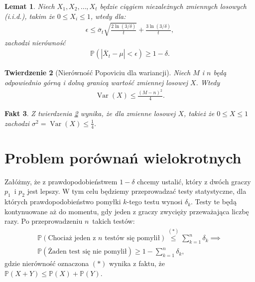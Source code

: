 \documentclass[inzynierska]{pwr_wmat_praca_dyplomowa}
\theoremstyle{plain}
\newtheorem{theorem}{Twierdzenie}
\numberwithin{theorem}{chapter}
\newtheorem{lemma}[theorem]{Lemat}
\newtheorem{fact}[theorem]{Fakt}
\theoremstyle{definition}
\numberwithin{theorem}{chapter}
\DeclareMathOperator{\Var}{\mathrm{Var}}%
\newcommand{\probP}{\mathbb{P}}
\newcommand{\newbrackets}[1]{\emph{(}{#1}\emph{)}}
\begin{document}
	\begin{lemma}\label{Bernsteina emp ineq lemma}
		Niech $X_1, X_2, \dots, X_t$ będzie ciągiem niezależnych zmiennych losowych \newbrackets{i.i.d.}, takim że $0 \le X_i \le 1$, wtedy dla:
		\begin{gather*}
			\epsilon \le \overline{\sigma}_t \sqrt{\frac{2\ln(3/\delta)}{t}} + \frac{3  \ln{(3 / \delta)}}{t},
		\end{gather*}
		zachodzi nierówność
		\begin{gather*}
			\probP(|\overline{X}_t - \mu | < \epsilon ) \ge 1 - \delta.
		\end{gather*}
	\end{lemma}
	\begin{theorem}[Nierówność Popoviciu dla wariancji]
		\label{Popoviciu_ineq}
		Niech $M$ i $n$ będą odpowiednio górną i dolną granicą wartość zmiennej losowej $X$. Wtedy
		\begin{gather*}
			\Var (X) \le \frac{(M -n)^2}{4}.
		\end{gather*}
	\end{theorem}	
	\begin{fact}
		\label{fact:Popoviciu_ineq}
		Z twierdzenia \ref{Popoviciu_ineq} wynika, że dla zmienne losowej $X$, takież że $0\le X \le1$ zachodzi $\sigma^2 = \Var (X) \le \frac{1}{4}$. 
	\end{fact}
	\section{Problem porównań wielokrotnych}
	Załóżmy, że z prawdopodobieństwem $1-\delta$ chcemy ustalić, który z dwóch graczy $p_1$~i $p_2$ jest lepszy. W tym celu będziemy przeprowadzać testy statystyczne, dla których	prawdopodobieństwo pomyłki $k$-tego testu wynosi $\delta_k$. Testy te będą kontynuowane aż do momentu, gdy jeden z graczy zwycięży przeważająca liczbę razy. Po przeprowadzeniu $n$~takich testów:
	\begin{gather*}
		\probP(\text{Chociaż jeden z $n$ testów się pomylił}) \overset{(*)}{\le} \sum_{k=1}^n \delta_k \implies  \\
	\probP(\text{Żaden test się nie pomylił}) \ge 1 - \sum_{k=1}^n \delta_k,
	\end{gather*} 
	gdzie nierówność oznaczona $(*)$ wynika z faktu, że $\probP(X+Y) \le \probP(X) + \probP(Y)$.
	
\end{document}
